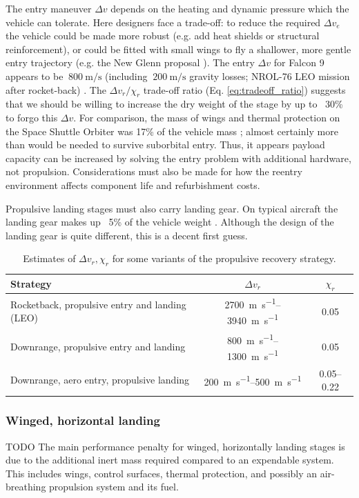 \documentclass[conf]{new-aiaa}
\begin{document}
The entry maneuver $\Delta v$ depends on the heating and dynamic pressure which the vehicle can tolerate. Here designers face a trade-off: to reduce the required $\Delta v_e$ the vehicle could be made more robust (e.g. add heat shields or structural reinforcement), or could be fitted with small wings to fly a shallower, more gentle entry trajectory (e.g. the New Glenn proposal \cite{NewGlenn}). The entry $\Delta v$ for Falcon 9 appears to be $~\SI{800}{\meter\per\second}$ (including $~\SI{200}{\meter\per\second}$ gravity losses; NROL-76 LEO mission after rocket-back) \cite{Dumont2017}\cite{SpaceXWebcast}. The $\Delta v_r/\chi_r$ trade-off ratio (Eq. \ref{eq:tradeoff_ratio}) suggests that we should be willing to increase the dry weight of the stage by up to ~30\% to forgo this $\Delta v$. For comparison, the mass of wings and thermal protection on the Space Shuttle Orbiter was 17\% of the vehicle mass \cite{Sforza2015}; almost certainly more than would be needed to survive suborbital entry. Thus, it appears payload capacity can be increased by solving the entry problem with additional hardware, not propulsion. Considerations must also be made for how the reentry environment affects component life and refurbishment costs.

Propulsive landing stages must also carry landing gear. On typical aircraft the landing gear makes up ~5\% of the vehicle weight \cite{Sforza2015}. Although the design of the landing gear is quite different, this is a decent first guess.

\begin{table}
	\caption{\label{tab:propulsive_strategies} Estimates of $\Delta v_r, \chi_r$ for some variants of the propulsive recovery strategy.}
	\centering
	\begin{tabular}{p{6cm} c c}
		Strategy & $\Delta v_r$ & $\chi_r$ \\
		\hline
		Rocketback, propulsive entry and landing (LEO) & \SIrange{2700}{3940}{\meter\per\second} & 0.05\\
		Downrange, propulsive entry and landing & \SIrange{800}{1300}{\meter\per\second} & 0.05 \\
		Downrange, aero entry, propulsive landing & \SIrange{200}{500}{\meter\per\second} & \SIrange{0.05}{0.22}{}\\
		\hline
	\end{tabular}
\end{table}


\subsubsection{Winged, horizontal landing}
TODO
The main performance penalty for winged, horizontally landing stages is due to the additional inert mass required compared to an expendable system. This includes wings, control surfaces, thermal protection, and possibly an air-breathing propulsion system and its fuel.
\end{document}
